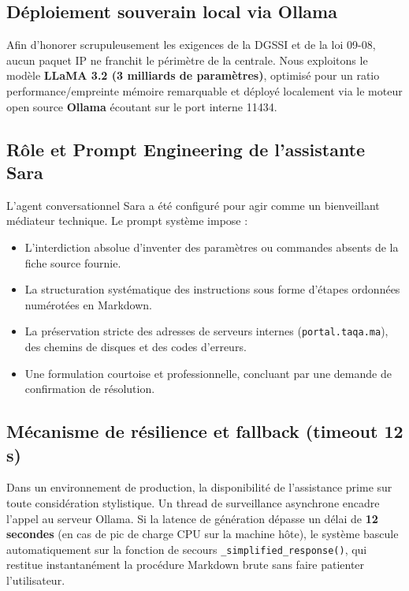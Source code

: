 \documentclass[12pt, a4paper, oneside]{report}
\begin{document}
\subsection{Déploiement souverain local via Ollama}

Afin d'honorer scrupuleusement les exigences de la DGSSI et de la loi 09-08, aucun paquet IP ne franchit le périmètre de la centrale. Nous exploitons le modèle \textbf{LLaMA 3.2 (3 milliards de paramètres)}, optimisé pour un ratio performance/empreinte mémoire remarquable et déployé localement via le moteur open source \textbf{Ollama} écoutant sur le port interne 11434.

\subsection{Rôle et Prompt Engineering de l'assistante Sara}

L'agent conversationnel Sara a été configuré pour agir comme un bienveillant médiateur technique. Le prompt système impose :
\begin{itemize}
  \item L'interdiction absolue d'inventer des paramètres ou commandes absents de la fiche source fournie.
  \item La structuration systématique des instructions sous forme d'étapes ordonnées numérotées en Markdown.
  \item La préservation stricte des adresses de serveurs internes (\texttt{portal.taqa.ma}), des chemins de disques et des codes d'erreurs.
  \item Une formulation courtoise et professionnelle, concluant par une demande de confirmation de résolution.
\end{itemize}

\subsection{Mécanisme de résilience et fallback (timeout 12 s)}

Dans un environnement de production, la disponibilité de l'assistance prime sur toute considération stylistique. Un thread de surveillance asynchrone encadre l'appel au serveur Ollama. Si la latence de génération dépasse un délai de \textbf{12 secondes} (en cas de pic de charge CPU sur la machine hôte), le système bascule automatiquement sur la fonction de secours \texttt{\_simplified\_response()}, qui restitue instantanément la procédure Markdown brute sans faire patienter l'utilisateur.
\end{document}
